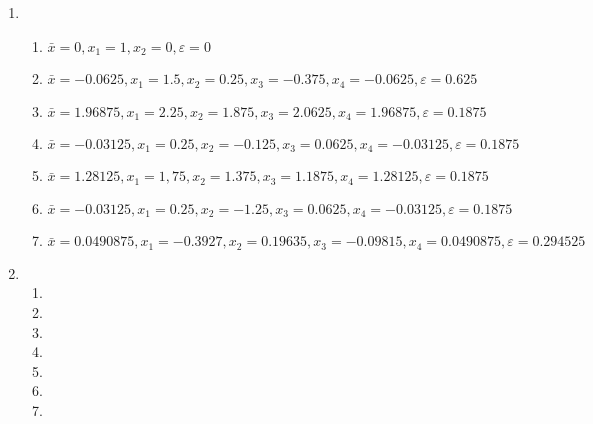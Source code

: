 \documentclass[a4paper]{article}
\providecommand{\sin}{} \renewcommand{\sin}{\hspace{2pt}\mathrm{sen}}
\begin{document}
\begin{enumerate}
\item %

  \begin{enumerate}
  \item $\bar{x}=0, x_1=1, x_2=0, \varepsilon=0$ %
  \item $\bar{x}=-0.0625, x_1=1.5, x_2=0.25, x_3=-0.375, x_4=-0.0625, \varepsilon=0.625$ %
  \item $\bar{x}=1.96875, x_1=2.25, x_2=1.875, x_3=2.0625, x_4=1.96875, \varepsilon=0.1875$ %
  \item $\bar{x}=-0.03125, x_1=0.25, x_2=-0.125, x_3=0.0625, x_4=-0.03125, \varepsilon=0.1875$ %
  \item $\bar{x}=1.28125, x_1=1,75, x_2=1.375, x_3=1.1875, x_4=1.28125, \varepsilon=0.1875$ %
  \item $\bar{x}=-0.03125, x_1=0.25, x_2=-1.25, x_3=0.0625, x_4=-0.03125, \varepsilon=0.1875$ %
  \item $\bar{x}=0.0490875, x_1=-0.3927, x_2=0.19635, x_3=-0.09815, x_4=0.0490875, \varepsilon=0.294525$ %
  \end{enumerate}

\item %
  \begin{enumerate}
  \item %
  \item %
  \item %
  \item %
  \item %
  \item %
  \item %
  \end{enumerate}


\end{enumerate}
\end{document}
